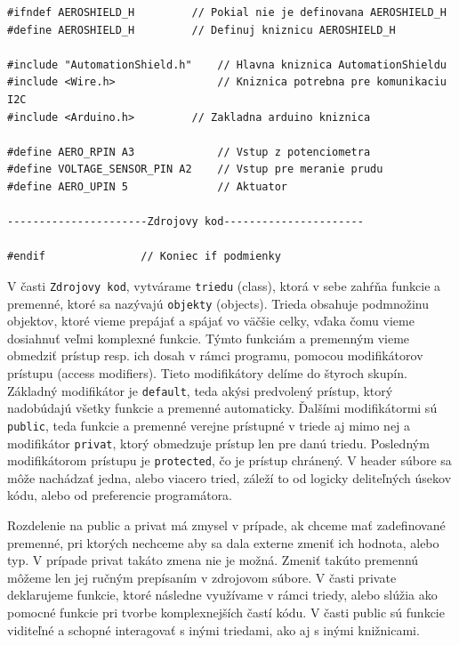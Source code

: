 \begin{lstlisting}[caption={Ukážka zdrojového kódu headeru.},captionpos=b]
#ifndef AEROSHIELD_H	 	 // Pokial nie je definovana AEROSHIELD_H
#define AEROSHIELD_H	 	 // Definuj kniznicu AEROSHIELD_H

#include "AutomationShield.h"    // Hlavna kniznica AutomationShieldu
#include <Wire.h>                // Kniznica potrebna pre komunikaciu I2C
#include <Arduino.h>		 // Zakladna arduino kniznica

#define AERO_RPIN A3             // Vstup z potenciometra
#define VOLTAGE_SENSOR_PIN A2    // Vstup pre meranie prudu 
#define AERO_UPIN 5              // Aktuator

----------------------Zdrojovy kod----------------------

#endif			   	 // Koniec if podmienky 
\end{lstlisting}



V časti \verb|Zdrojovy kod|, vytvárame \verb|triedu| (class), ktorá v sebe zahŕňa funkcie a premenné, ktoré sa nazývajú \verb|objekty| (objects). Trieda obsahuje podmnožinu objektov, ktoré vieme prepájať a spájať vo väčšie celky, vďaka čomu vieme dosiahnuť veľmi komplexné funkcie. Týmto funkciám a premenným vieme obmedziť prístup resp. ich dosah v rámci programu, pomocou modifikátorov prístupu (access modifiers). Tieto modifikátory delíme do štyroch skupín. Základný modifikátor je \verb|default|, teda akýsi predvolený prístup, ktorý nadobúdajú všetky funkcie a premenné automaticky. Ďalšími modifikátormi sú \verb|public|, teda funkcie a premenné verejne prístupné v triede aj mimo nej a modifikátor \verb|privat|, ktorý obmedzuje prístup len pre danú triedu. Posledným modifikátorom prístupu je \verb|protected|, čo je prístup chránený. V header súbore sa môže nachádzať jedna, alebo viacero tried, záleží to od logicky deliteľných úsekov kódu, alebo od preferencie programátora. 

Rozdelenie na public a privat má zmysel v prípade, ak chceme mať zadefinované premenné, pri ktorých nechceme aby sa dala externe zmeniť ich hodnota, alebo typ. V prípade privat takáto zmena nie je možná. Zmeniť takúto premennú môžeme len jej ručným prepísaním v zdrojovom súbore. V časti private deklarujeme funkcie, ktoré následne využívame v rámci triedy, alebo slúžia ako pomocné funkcie pri tvorbe komplexnejších častí kódu. V časti public sú funkcie viditeľné a schopné interagovať s inými triedami, ako aj s inými knižnicami. 


